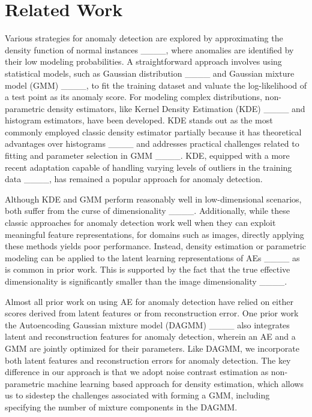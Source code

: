 \section{Related Work}
Various strategies for anomaly detection are explored by approximating the density function of normal instances ____, where anomalies are identified by their low modeling probabilities. A straightforward approach involves using statistical models, such as Gaussian distribution ____ and Gaussian mixture model (GMM) ____, to fit the training dataset and valuate the log-likelihood of a test point as its anomaly score. For modeling complex distributions, non-parametric density estimators, like Kernel Density Estimation (KDE) ____ and histogram estimators, have been developed. KDE stands out as the most commonly employed classic density estimator partially because it has theoretical advantages over histograms ____ and addresses practical challenges related to fitting and parameter selection in GMM ____. KDE, equipped with a more recent adaptation capable of handling varying levels of outliers in the training data ____, has remained a popular approach for anomaly detection. 

Although KDE and GMM perform reasonably well in low-dimensional scenarios, both suffer from the curse of dimensionality ____. Additionally, while these classic approaches for anomaly detection work well when they can exploit meaningful feature representations, for domains such as images, directly applying these methods yields poor performance. Instead, density estimation or parametric modeling can be applied to the latent learning representations of AEs ____ as is common in prior work. This is supported by the fact that the true effective dimensionality is significantly smaller than the image dimensionality ____. 


Almost all prior work on using AE for anomaly detection have relied on either scores derived from latent features or from reconstruction error. One prior work the Autoencoding Gaussian mixture model (DAGMM) ____ also integrates latent and reconstruction features for anomaly detection,  wherein an AE and a GMM are jointly optimized for their parameters. Like DAGMM, we incorporate both latent features and reconstruction errors for anomaly detection. The key difference in our approach is that we adopt noise contrast estimation as non-parametric machine learning based approach for density estimation, which allows us to sidestep the challenges associated with forming a GMM, including specifying the number of mixture components in the DAGMM.

